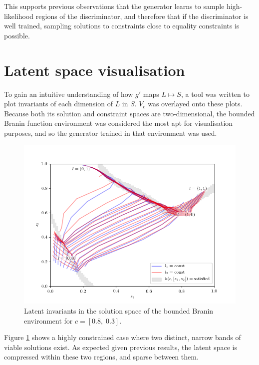 \documentclass[../../main.tex]{subfiles}
\begin{document}
This supports previous observations that the generator learns to sample high-likelihood regions of the discriminator, and therefore that if the discriminator is well trained, sampling solutions to constraints close to equality constraints is possible.

\section{Latent space visualisation} \label{section:latentSpaceVisualisation}

To gain an intuitive understanding of how $g'$ maps $L\mapsto S$, a tool was written to plot invariants of each dimension of $L$ in $S$.
$V_c$ was overlayed onto these plots.
Because both its solution and constraint spaces are two-dimensional, the bounded Branin function environment was considered the most apt for visualisation purposes, and so the generator trained in that environment was used.
\begin{figure}[H]
    \begin{center}
    \includegraphics[width=\textwidth]{latentPlot0803}
    \caption{
        Latent invariants in the solution space of the bounded Branin environment for $c=[0.8,\;0.3]$.
    }
    \label{fig:latentPlot0803}
    \end{center}
\end{figure}
Figure \ref{fig:latentPlot0803} shows a highly constrained case where two distinct, narrow bands of viable solutions exist.
As expected given previous results, the latent space is compressed within these two regions, and sparse between them.
\end{document}
